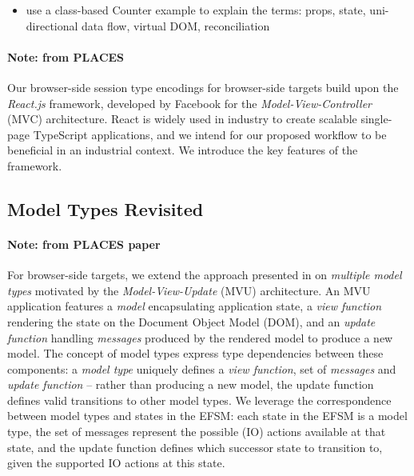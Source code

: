 \begin{itemize}
\item use a class-based Counter example to explain the terms: props, state, uni-directional data flow, virtual DOM, reconciliation
\end{itemize}

\paragraph{Note: from PLACES}
Our browser-side session type encodings for browser-side targets build upon the
\emph{React.js} framework, developed by Facebook \cite{React} for the
\textit{Model-View-Controller} (MVC) architecture.
React is widely used in industry to create scalable single-page TypeScript
applications, and we intend for our proposed workflow to be beneficial in an
industrial context.
We introduce the key features of the framework.



\subsection{Model Types Revisited}
\paragraph{Note: from PLACES paper}
For browser-side targets, we extend the approach presented in \cite{MVU2019} on
\textit{multiple model types} motivated by the \textit{Model-View-Update} (MVU)
architecture.
An MVU application features a \textit{model} encapsulating application
state, a \textit{view function} rendering the state on the Document Object Model (DOM), and an
\textit{update function} handling \textit{messages} produced by the
rendered model to produce a new model.
The concept of model types express type dependencies between these
components: a \emph{model type} uniquely defines a \textit{view function},
set of \textit{messages} and \textit{update function} -- rather than
producing a new model, the update function defines valid transitions to
other model types.
We leverage the correspondence between model types and states in the EFSM:
each state in the EFSM is a model type, the set of messages represent
the possible (IO) actions available at that state,
and the update function defines which successor state to transition to,
given the supported IO actions at this state.